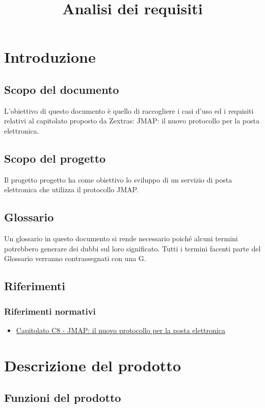 \documentclass[12pt]{article}
\title{Analisi dei requisiti}
\begin{document}
	\makefirstpage
	
	
	\clearpage
	
	\tableofcontents
	\clearpage
	

	\section{Introduzione}
    	\subsection{Scopo del documento}
    		L'obiettivo di questo documento è quello di raccogliere i casi d’uso ed i requisiti relativi al capitolato proposto da Zextras: JMAP: il nuovo protocollo per la posta elettronica.
  
    
    	\subsection{Scopo del progetto}
    		Il progetto progetto ha come obiettivo lo sviluppo di un servizio di posta elettronica che utilizza il protocollo JMAP.
    
    	\subsection{Glossario}
    		Un glossario in questo documento si rende necessario poiché alcuni termini potrebbero generare dei dubbi sul loro significato.
    		Tutti i termini facenti parte del Glossario verranno contrassegnati con una G.

    	\subsection{Riferimenti}
    		\subsubsection{Riferimenti normativi}
        		\begin{itemize}
            		\item \href{https://www.math.unipd.it/~tullio/IS-1/2023/Progetto/C8.pdf}{Capitolato C8 - JMAP: il nuovo protocollo per la posta elettronica}
        		\end{itemize}

	\section{Descrizione del prodotto}
    	\subsection{Funzioni del prodotto}




\end{document}
